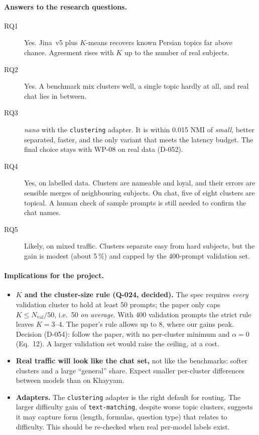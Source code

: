 \documentclass[11pt,a4paper]{article}
\begin{document}
\paragraph{Answers to the research questions.}
\begin{description}
\item[RQ1] Yes. Jina~v5 plus $K$-means recovers known Persian topics far above chance. Agreement rises with $K$ up
to the number of real subjects.
\item[RQ2] Yes. A benchmark mix clusters well, a single topic hardly at all, and real chat lies in between.
\item[RQ3] \emph{nano} with the \texttt{clustering} adapter. It is within 0.015 NMI of \emph{small}, better
separated, faster, and the only variant that meets the latency budget. The final choice stays with WP-08 on real
data (D-052).
\item[RQ4] Yes, on labelled data. Clusters are nameable and loyal, and their errors are sensible merges of
neighbouring subjects. On chat, five of eight clusters are topical. A human check of sample prompts is still
needed to confirm the chat names.
\item[RQ5] Likely, on mixed traffic. Clusters separate easy from hard subjects, but the gain is modest (about
5\,\%) and capped by the 400-prompt validation set.
\end{description}

\paragraph{Implications for the project.}
\begin{itemize}
\item \textbf{$K$ and the cluster-size rule (Q-024, decided).} The spec requires \emph{every} validation
cluster to hold at least 50 prompts; the paper only caps $K\le N_{\mathrm{val}}/50$, i.e.\ 50 \emph{on average}.
With 400 validation prompts the strict rule leaves $K=3$--4. The paper's rule allows up to 8, where our gains
peak. Decision (D-054): follow the paper, with no per-cluster minimum and $\alpha=0$ (Eq.~12).
A larger validation set would raise the ceiling, at a cost.
\item \textbf{Real traffic will look like the chat set,} not like the benchmarks: softer clusters and a large
``general'' share. Expect smaller per-cluster differences between models than on Khayyam.
\item \textbf{Adapters.} The \texttt{clustering} adapter is the right default for routing. The larger difficulty
gain of \texttt{text-matching}, despite worse topic clusters, suggests it may capture form (length, formulas,
question type) that relates to difficulty. This should be re-checked when real per-model labels exist.
\end{itemize}
\end{document}
